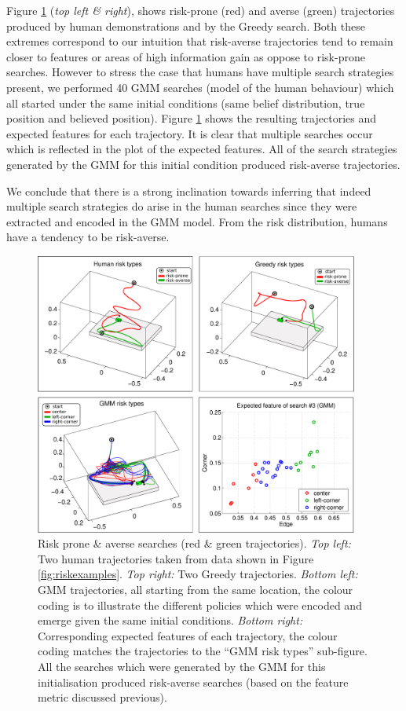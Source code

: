 Figure \ref{fig:risk_examples} (\textit{top left \& right}), shows risk-prone (red) and 
averse (green) trajectories produced by human demonstrations and by the Greedy search. Both these extremes
correspond to our intuition that risk-averse trajectories tend to remain closer to features or areas of high information gain
as oppose to risk-prone searches. However to stress the case that humans have multiple search strategies 
present, we performed 40 GMM searches (model of the human behaviour) which all started under the same initial conditions
(same belief distribution, true position and believed position). Figure \ref{fig:risk_examples}
shows the resulting trajectories and expected features for each trajectory. 
It is clear that multiple searches occur which is reflected in the plot of the expected features. All of the 
search strategies generated by the GMM for this initial condition produced risk-averse trajectories.


We conclude that there is a strong inclination towards inferring that indeed multiple search strategies do 
arise in the human searches since they were extracted and encoded in the GMM model. From the risk distribution, humans have a 
tendency to be risk-averse.

\begin{figure}
 \centering
  \includegraphics[width=0.95\textwidth]{./ch3-Search/Figures/Figure8}
  \caption{Risk prone \& averse searches (red \& green trajectories). \textit{Top left:}
  Two human trajectories taken from data shown in Figure \ref{fig:riskexamples}. 
  \textit{Top right:} Two Greedy trajectories. \textit{Bottom left:} GMM trajectories, all starting from the same location, the
  colour coding is to illustrate the different policies which were encoded and emerge given the same initial conditions. 
  \textit{Bottom right:} Corresponding expected features of each trajectory, the colour coding matches the trajectories 
  to the ``GMM risk types'' sub-figure. All the searches which were generated by the GMM for this initialisation produced
  risk-averse searches (based on the feature metric discussed previous).}
  \label{fig:risk_examples}
\end{figure}

